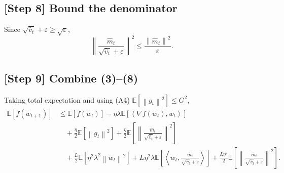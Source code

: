 \documentclass{article}
\newcommand{\EE}{\mathbb{E}}
\newcommand{\norm}[1]{\left\| #1\right\|}
\newcommand{\inner}[2]{\left\langle #1,#2\right\rangle}
\begin{document}
\subsection*{[Step 8] Bound the denominator}
Since $\sqrt{\hat v_t}+\varepsilon \ge \sqrt{\varepsilon}$,
\[
\norm{\frac{\hat m_t}{\sqrt{\hat v_t}+\varepsilon}}^2
\le \frac{\norm{\hat m_t}^2}{\varepsilon}. \tag{8}
\]

\subsection*{[Step 9] Combine (3)–(8)}
Taking total expectation and using (A4) $\EE[\norm{g_t}^2]\le G^2$,
\[
\begin{aligned}
\EE[f(w_{t+1})] &\le \EE[f(w_t)]
   -\eta\lambda\EE\!\left[\inner{\nabla f(w_t)}{w_t}\right] \\
   &\quad +\frac{\eta}{2}\EE\!\left[\norm{g_t}^2\right]
   +\frac{\eta}{2}\EE\!\left[\norm{\frac{\hat m_t}{\sqrt{\hat v_t}+\varepsilon}}^2\right]  \\
   &\quad +\frac{L}{2}\EE\!\left[\eta^2\lambda^2\norm{w_t}^2\right]
   +L\eta^2\lambda\EE\!\left[\inner{w_t}{\frac{\hat m_t}{\sqrt{\hat v_t}+\varepsilon}}\right]
   +\frac{L\eta^2}{2}\EE\!\left[\norm{\frac{\hat m_t}{\sqrt{\hat v_t}+\varepsilon}}^2\right].
\end{aligned} \tag{9}
\]
\end{document}
